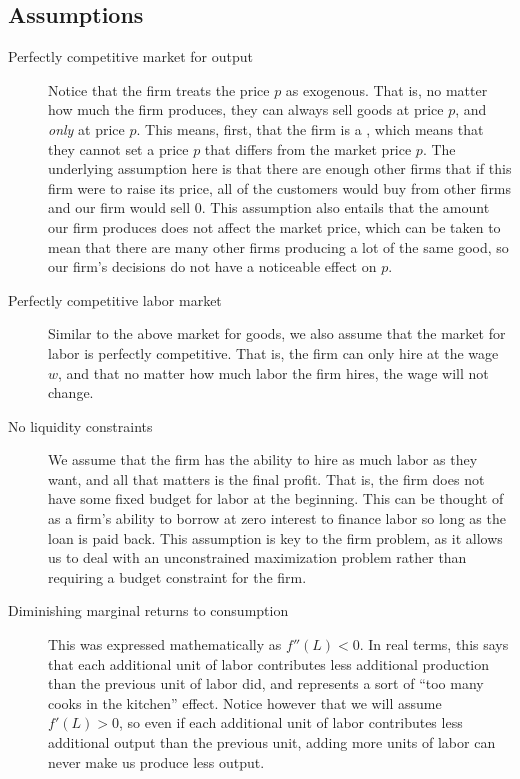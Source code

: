 \subsection*{Assumptions}
\begin{description}
    \item[Perfectly competitive market for output] Notice that the firm treats the price $p$ as exogenous. That is, no matter how much the firm produces, they can always sell goods at price $p$, and \emph{only} at price $p$. This means, first, that the firm is a , which means that they cannot set a price $p$ that differs from the market price $p$. The underlying assumption here is that there are enough other firms that if this firm were to raise its price, all of the customers would buy from other firms and our firm would sell 0. This assumption also entails that the amount our firm produces does not affect the market price, which can be taken to mean that there are many other firms producing a lot of the same good, so our firm's decisions do not have a noticeable effect on $p$. 
    \item[Perfectly competitive labor market] Similar to the above market for goods, we also assume that the market for labor is perfectly competitive. That is, the firm can only hire at the wage $w$, and that no matter how much labor the firm hires, the wage will not change. 
    \item[No liquidity constraints] We assume that the firm has the ability to hire as much labor as they want, and all that matters is the final profit. That is, the firm does not have some fixed budget for labor at the beginning. This can be thought of as a firm's ability to borrow at zero interest to finance labor so long as the loan is paid back. This assumption is key to the firm problem, as it allows us to deal with an unconstrained maximization problem rather than requiring a budget constraint for the firm. 
    \item[Diminishing marginal returns to consumption] This was expressed mathematically as $f''(L) < 0$. In real terms, this says that each additional unit of labor contributes less additional production than the previous unit of labor did, and represents a sort of ``too many cooks in the kitchen'' effect. Notice however that we will assume $f'(L) > 0$, so even if each additional unit of labor contributes less additional output than the previous unit, adding more units of labor can never make us produce less output. 
\end{description}

